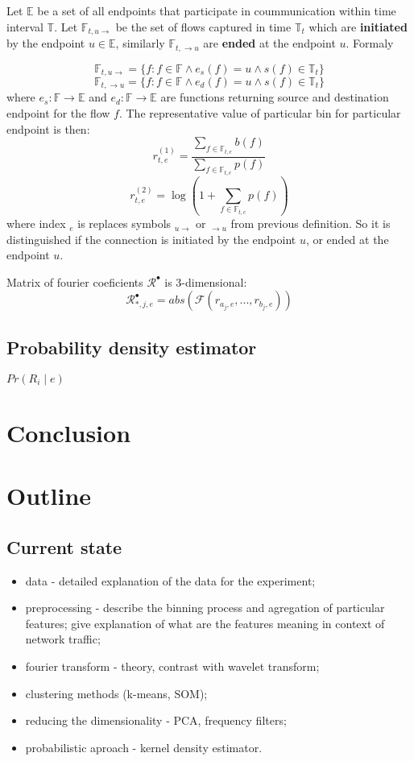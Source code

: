 \documentclass[a4paper]{IEEEtran}
\begin{document}
Let $\mathbb{E}$ be a set of all endpoints that
participate in coummunication within time interval $\mathbb{T}$.
Let $\mathbb{F}_{t,u \rightarrow}$ be the set of flows captured in
time $\mathbb{T}_{t}$ %
which are \textbf{initiated} by the endpoint $u \in \mathbb{E}$,
similarly $\mathbb{F}_{t, \rightarrow u}$ are \textbf{ended} at the
endpoint $u$. Formaly

\[
\mathbb{F}_{t,u \rightarrow} = \{f : f \in \mathbb{F} \wedge e_{s}(f) = u \wedge s(f) \in \mathbb{T}_t \}
\]
\[
\mathbb{F}_{t, \rightarrow u} = \{f : f \in \mathbb{F} \wedge e_{d}(f) = u \wedge s(f) \in \mathbb{T}_t \}
\]
where $e_{s}:\mathbb{F}\rightarrow \mathbb{E}$ and
$e_{d}:\mathbb{F}\rightarrow \mathbb{E}$ 
are functions returning source and destination endpoint for the 
flow $f$.
The representative value of particular bin for particular endpoint is 
then:
\[
r_{t,e}^{(1)} = \frac{\sum\limits_{f\in \mathbb{F}_{t,e}}b(f)}{\sum\limits_{f\in \mathbb{F}_{t,e}}p(f)}
\]
\[
r_{t,e}^{(2)} = \log(1+\sum\limits_{f\in \mathbb{F}_{t,e}}p(f))
\]
where index ${}_e$ is replaces symbols ${}_{u\rightarrow}$ or 
${}_{\rightarrow u}$ from previous definition. So it is distinguished 
if the connection is initiated by the endpoint $u$, or ended at the
endpoint $u$.

Matrix of fourier coeficients $\mathcal{R}^\bullet$ is 3-dimensional:
\[
\mathcal{R}^\bullet_{*,j,e} = abs(\mathcal{F}(r_{a_j,e}, ..., r_{b_j,e}))
\]


\subsection{Probability density estimator}
$Pr(R_i\mid e)$


\section{Conclusion}


\section{Outline}
\subsection{Current state}
\begin{itemize}
	\item data - detailed explanation of the data for the experiment;
	\item preprocessing - describe the binning process and agregation of particular features; give explanation of what are the features meaning in context of network traffic;
	\item fourier transform - theory, contrast with wavelet transform;
	\item clustering methods (k-means, SOM);
	\item reducing the dimensionality - PCA, frequency filters;
	\item probabilistic aproach - kernel density estimator.
\end{itemize}
\end{document}
